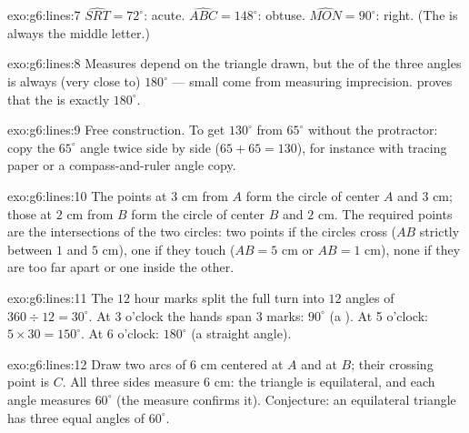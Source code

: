 \begin{solution}{exo:g6:lines:7}
$\widehat{SRT} = 72^\circ$: acute. \quad
$\widehat{ABC} = 148^\circ$: obtuse. \quad
$\widehat{MON} = 90^\circ$: right. (The  is always the middle
letter.)
\end{solution}

\begin{solution}{exo:g6:lines:8}
Measures depend on the triangle drawn, but the  of the three angles
is always (very close to) $180^\circ$ --- small  come from
measuring imprecision.  proves that the  is
exactly $180^\circ$.
\end{solution}

\begin{solution}{exo:g6:lines:9}
Free construction. To get $130^\circ$ from $65^\circ$ without the
protractor: copy the $65^\circ$ angle twice side by side ($65 + 65 =
130$), for instance with tracing paper or a compass-and-ruler angle
copy.
\end{solution}

\begin{solution}{exo:g6:lines:10}
The points at $3$ cm from $A$ form the circle of center $A$ and 
$3$ cm; those at $2$ cm from $B$ form the circle of center $B$ and
 $2$ cm. The required points are the intersections of the two
circles: two points if the circles cross ($AB$ strictly between $1$ and
$5$ cm), one if they touch ($AB = 5$ cm or $AB = 1$ cm), none if they
are too far apart or one inside the other.
\end{solution}

\begin{solution}{exo:g6:lines:11}
The $12$ hour marks split the full turn into $12$ angles of
$360 \div 12 = 30^\circ$. At 3 o'clock the hands span $3$ marks:
$90^\circ$ (a ). At 5 o'clock: $5 \times 30 = 150^\circ$.
At 6 o'clock: $180^\circ$ (a straight angle).
\end{solution}

\begin{solution}{exo:g6:lines:12}
Draw two arcs of  $6$ cm centered at $A$ and at $B$; their
crossing point is $C$. All three sides measure $6$ cm: the triangle is
equilateral, and each angle measures $60^\circ$ (the measure confirms
it). Conjecture: an equilateral triangle has three equal angles of
$60^\circ$.
\end{solution}


